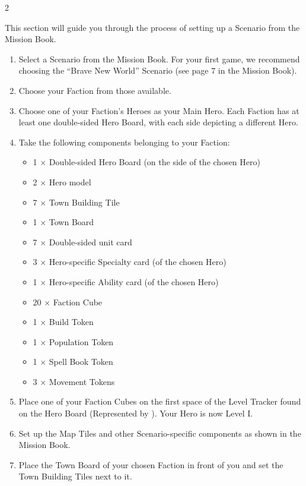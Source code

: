 
\begin{multicols*}{2}

This section will guide you through the process of setting up a Scenario from the Mission Book.

\begin{enumerate}[leftmargin=2.3em]
  \item Select a Scenario from the Mission Book.
    For your first game, we recommend choosing the ``Brave New World'' Scenario (see page 7 in the Mission Book).
  \item Choose your Faction from those available.
  \item Choose one of your Faction's Heroes as your Main Hero.
    Each Faction has at least one double-sided Hero Board, with each side depicting a different Hero.
  \item Take the following components belonging to your Faction:
  \begin{itemize}
    \item[a)]1 × Double-sided Hero Board (on the side of the chosen Hero)
    \item[b)]2 × Hero model
    \item[c)]7 × Town Building Tile
    \item[d)]1 × Town Board
    \item[e)]7 × Double-sided unit card
    \item[f)]3 × Hero-specific Specialty card (of the chosen Hero)
    \item[g)]1 × Hero-specific Ability card (of the chosen Hero)
    \item[h)]20 × Faction Cube
    \item[i)]1 × Build Token
    \item[j)]1 × Population Token
    \item[k)]1 × Spell Book Token
    \item[l)]3 × Movement Tokens
  \end{itemize}
  \item Place one of your Faction Cubes on the first space of the Level Tracker found on the Hero Board (Represented by ).
    Your Hero is now Level I.
  \item Set up the Map Tiles and other Scenario-specific components as shown in the Mission Book.
  \item Place the Town Board of your chosen Faction in front of you and set the Town Building Tiles next to it.

\end{enumerate}
\end{multicols*}
